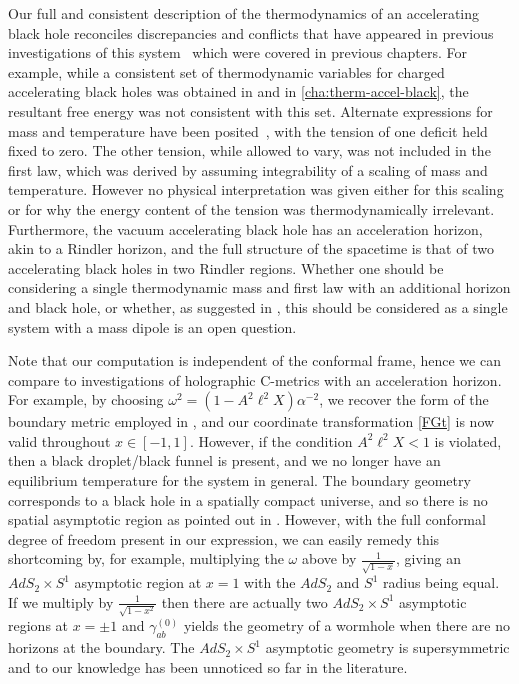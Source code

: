 \documentclass[
twoside,
openright,
frontopenright,
]{dmathesis}
\begin{document}
Our full and consistent description of the thermodynamics of an accelerating
black hole reconciles discrepancies and conflicts that have appeared in previous
investigations of this system~\cite{Appels:2016uha,
  Appels:2017xoe,Astorino:2016ybm} which were covered in previous chapters.  For
example, while a consistent set of thermodynamic variables for charged
accelerating black holes was obtained in
\cite{Appels:2016uha,Appels:2017xoe,Gregory:2017ogk} and in
\cref{cha:therm-accel-black}, the resultant free energy was not consistent with
this set.  Alternate expressions for mass and temperature have been
posited~\cite{Astorino:2016ybm}, with the tension of one deficit held fixed to
zero.  The other tension, while allowed to vary, was not included in the first
law, which was derived by assuming integrability of a scaling of mass and
temperature.  However no physical interpretation was given either for this
scaling or for why the energy content of the tension was thermodynamically
irrelevant.  Furthermore, the vacuum accelerating black hole has an acceleration
horizon, akin to a Rindler horizon, and the full structure of the spacetime is
that of two accelerating black holes in two Rindler regions. Whether one should
be considering a single thermodynamic mass and first law with an additional
horizon and black hole, or whether, as suggested in \cite{Dutta:2005iy}, this
should be considered as a single system with a mass dipole is an open question.

Note that our computation is independent of the conformal frame, hence
we can compare to investigations of holographic C-metrics with an
acceleration horizon. For example, by choosing $\omega^2 =
(1-A^{2}\ell^{2}X)\alpha^{-2}$, we recover the form of the boundary metric
employed in \cite{Hubeny:2009kz}, and our coordinate transformation
\eqref{FGt} is now valid throughout $x\in[-1,1]$. However, if the condition
$ A^{2}\ell^{2} X <1$ is violated, then a black droplet/black funnel is present,
and we no longer have an equilibrium temperature for the system in general.
The boundary geometry corresponds to a black hole in a spatially compact
universe, and so there is no spatial asymptotic region as pointed out
in \cite{Hubeny:2009kz}. However, with the full conformal degree of
freedom present in our expression, we can easily remedy this shortcoming
by, for example, multiplying the $\omega$ above by $\frac{1}{\sqrt{1-x}}$,
giving an $AdS_{2}\times S^{1}$ asymptotic region at $x=1$ with the $AdS_{2}$
and $S^{1}$ radius being equal. If we multiply by $\frac{1}{\sqrt{1-x^2}}$ then
there are actually two $AdS_{2}\times S^{1}$ asymptotic regions at $x=\pm1$
and $\gamma^{(0)}_{ab}$ yields the geometry of a wormhole when there are no
horizons at the boundary.
The $AdS_{2}\times S^{1}$ asymptotic geometry is supersymmetric
and to our knowledge has been unnoticed so far in the literature.
\end{document}
